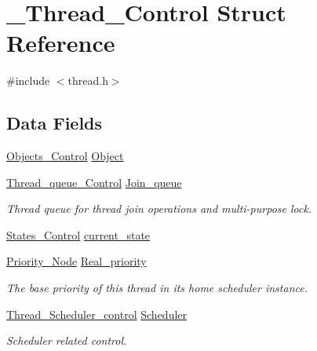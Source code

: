 \hypertarget{struct__Thread__Control}{}\section{\+\_\+\+Thread\+\_\+\+Control Struct Reference}
\label{struct__Thread__Control}


{\ttfamily \#include $<$thread.\+h$>$}

\subsection*{Data Fields}
\begin{DoxyCompactItemize}
\item 
\mbox{\hyperlink{structObjects__Control}{Objects\+\_\+\+Control}} \mbox{\hyperlink{struct__Thread__Control_a139d65c71b92360520466017b402075b}{Object}}
\item 
\mbox{\hyperlink{structThread__queue__Control}{Thread\+\_\+queue\+\_\+\+Control}} \mbox{\hyperlink{struct__Thread__Control_a69f349249f56344621bf9a64b70bbfa9}{Join\+\_\+queue}}
\begin{DoxyCompactList}\small\item\em Thread queue for thread join operations and multi-\/purpose lock. \end{DoxyCompactList}\item 
\mbox{\hyperlink{group__RTEMSScoreStates_gaeebbea0bfca162709b124fd519cf99d3}{States\+\_\+\+Control}} \mbox{\hyperlink{struct__Thread__Control_a537008b7050b384664cfb5b2b407facf}{current\+\_\+state}}
\item 
\mbox{\label{struct__Thread__Control_a40c246d3705b3b0c766cc226424d0ea3}} 
\mbox{\hyperlink{structPriority__Node}{Priority\+\_\+\+Node}} \mbox{\hyperlink{struct__Thread__Control_a40c246d3705b3b0c766cc226424d0ea3}{Real\+\_\+priority}}
\begin{DoxyCompactList}\small\item\em The base priority of this thread in its home scheduler instance. \end{DoxyCompactList}\item 
\mbox{\label{struct__Thread__Control_a64628868b6c0d4abbb5c285d835e1fd7}} 
\mbox{\hyperlink{structThread__Scheduler__control}{Thread\+\_\+\+Scheduler\+\_\+control}} \mbox{\hyperlink{struct__Thread__Control_a64628868b6c0d4abbb5c285d835e1fd7}{Scheduler}}
\begin{DoxyCompactList}\small\item\em Scheduler related control. \end{DoxyCompactList}\item 

\end{DoxyCompactItemize}
